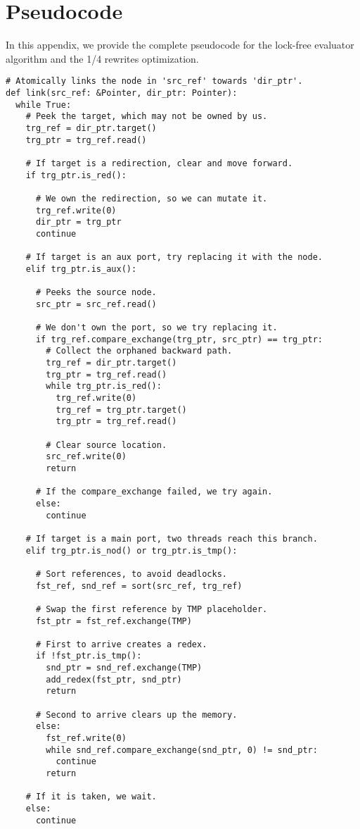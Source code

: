 \documentclass{article}
\begin{document}
\appendix
\section{Pseudocode}\label{app:pseudocode}

In this appendix, we provide the complete pseudocode for the lock-free evaluator algorithm and the 1/4 rewrites optimization.

\begin{lstlisting}
# Atomically links the node in 'src_ref' towards 'dir_ptr'.
def link(src_ref: &Pointer, dir_ptr: Pointer):
  while True:
    # Peek the target, which may not be owned by us.
    trg_ref = dir_ptr.target()
    trg_ptr = trg_ref.read()

    # If target is a redirection, clear and move forward.
    if trg_ptr.is_red():

      # We own the redirection, so we can mutate it.
      trg_ref.write(0)
      dir_ptr = trg_ptr
      continue

    # If target is an aux port, try replacing it with the node.
    elif trg_ptr.is_aux():

      # Peeks the source node.
      src_ptr = src_ref.read()

      # We don't own the port, so we try replacing it.
      if trg_ref.compare_exchange(trg_ptr, src_ptr) == trg_ptr:
        # Collect the orphaned backward path.
        trg_ref = dir_ptr.target()
        trg_ptr = trg_ref.read()
        while trg_ptr.is_red():
          trg_ref.write(0)
          trg_ref = trg_ptr.target()
          trg_ptr = trg_ref.read()

        # Clear source location.
        src_ref.write(0)
        return

      # If the compare_exchange failed, we try again.
      else:
        continue

    # If target is a main port, two threads reach this branch.
    elif trg_ptr.is_nod() or trg_ptr.is_tmp():

      # Sort references, to avoid deadlocks.
      fst_ref, snd_ref = sort(src_ref, trg_ref)

      # Swap the first reference by TMP placeholder.
      fst_ptr = fst_ref.exchange(TMP)

      # First to arrive creates a redex.
      if !fst_ptr.is_tmp():
        snd_ptr = snd_ref.exchange(TMP)
        add_redex(fst_ptr, snd_ptr)
        return

      # Second to arrive clears up the memory.
      else:
        fst_ref.write(0)
        while snd_ref.compare_exchange(snd_ptr, 0) != snd_ptr:
          continue
        return

    # If it is taken, we wait.
    else:
      continue
\end{lstlisting}
\end{document}
